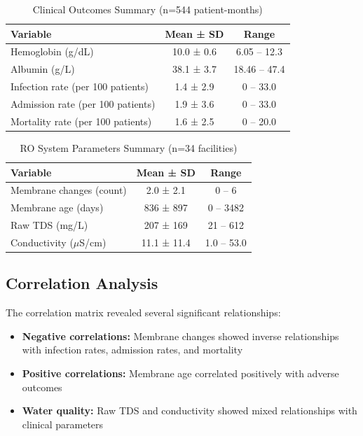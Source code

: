 \documentclass[11pt,a4paper]{article}
\begin{document}
\begin{table}[H]
\centering
\caption{Clinical Outcomes Summary (n=544 patient-months)}
\begin{tabular}{@{}lcc@{}}
\toprule
\textbf{Variable} & \textbf{Mean ± SD} & \textbf{Range} \\
\midrule
Hemoglobin (g/dL) & 10.0 ± 0.6 & 6.05 -- 12.3 \\
Albumin (g/L) & 38.1 ± 3.7 & 18.46 -- 47.4 \\
Infection rate (per 100 patients) & 1.4 ± 2.9 & 0 -- 33.0 \\
Admission rate (per 100 patients) & 1.9 ± 3.6 & 0 -- 33.0 \\
Mortality rate (per 100 patients) & 1.6 ± 2.5 & 0 -- 20.0 \\
\bottomrule
\end{tabular}
\end{table}

\begin{table}[H]
\centering
\caption{RO System Parameters Summary (n=34 facilities)}
\begin{tabular}{@{}lcc@{}}
\toprule
\textbf{Variable} & \textbf{Mean ± SD} & \textbf{Range} \\
\midrule
Membrane changes (count) & 2.0 ± 2.1 & 0 -- 6 \\
Membrane age (days) & 836 ± 897 & 0 -- 3482 \\
Raw TDS (mg/L) & 207 ± 169 & 21 -- 612 \\
Conductivity ($\mu$S/cm) & 11.1 ± 11.4 & 1.0 -- 53.0 \\
\bottomrule
\end{tabular}
\end{table}

\subsection{Correlation Analysis}

The correlation matrix revealed several significant relationships:
\begin{itemize}
    \item \textbf{Negative correlations:} Membrane changes showed inverse relationships with infection rates, admission rates, and mortality
    \item \textbf{Positive correlations:} Membrane age correlated positively with adverse outcomes
    \item \textbf{Water quality:} Raw TDS and conductivity showed mixed relationships with clinical parameters
\end{itemize}
\end{document}
